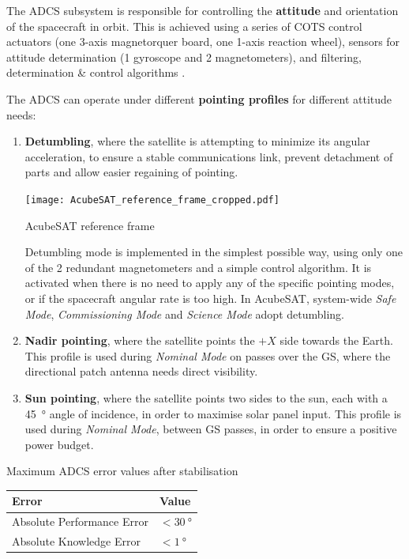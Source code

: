 \documentclass[a4paper,nobib,final]{tufte-book}
\begin{document}
The \ac{ADCS} subsystem is responsible for controlling the \textbf{attitude} and orientation of the spacecraft in orbit. This is achieved using a series of \ac{COTS} control actuators (one 3-axis magnetorquer board, one 1-axis reaction wheel), sensors for attitude determination (1 gyroscope and 2 magnetometers), and filtering, determination \& control algorithms \autocite{DDJF_AOCS}.

The \ac{ADCS} can operate under different \textbf{pointing profiles} for different attitude needs:
\begin{enumerate}
	\item \textbf{Detumbling}, where the satellite is attempting to minimize its angular acceleration, to ensure a stable communications link, prevent detachment of parts and allow easier regaining of pointing.
	
	\begin{marginfigure}
		\centering
		\texttt{[image: AcubeSAT\_reference\_frame\_cropped.pdf]}
		\caption{AcubeSAT reference frame}
		\label{fig:frame}
	\end{marginfigure}
	
	Detumbling mode is implemented in the simplest possible way, using only one of the 2 redundant magnetometers and a simple control algorithm. It is activated when there is no need to apply any of the specific pointing modes, or if the spacecraft angular rate is too high. In AcubeSAT, system-wide \emph{Safe Mode}, \emph{Commissioning Mode} and \emph{Science Mode} adopt detumbling.
	
	\item \textbf{Nadir pointing}, where the satellite points the \(+X\) side towards the Earth. This profile is used during \emph{Nominal Mode} on passes over the \acl{GS}, where the directional patch antenna needs direct visibility.
	
	\item \textbf{Sun pointing}, where the satellite points two sides to the sun, each with a \SI{45}{\degree} angle of incidence, in order to maximise solar panel input. This profile is used during \emph{Nominal Mode}, between \ac{GS} passes, in order to ensure a positive power budget.
\end{enumerate}

\begin{margintable}
	\centering
	\caption[Maximum ADCS error values after stabilisation]{Maximum \ac{ADCS} error values after stabilisation}
	\label{tab:adcsape}
	\begin{tabular}{@{}ll@{}}
		\toprule
		Error                      & Value                    \\ \midrule
		Absolute Performance Error & \( < \SI{30}{\degree} \) \\
		Absolute Knowledge Error   & \( < \SI{1}{\degree} \) 
	\end{tabular}
\end{margintable}
\end{document}
